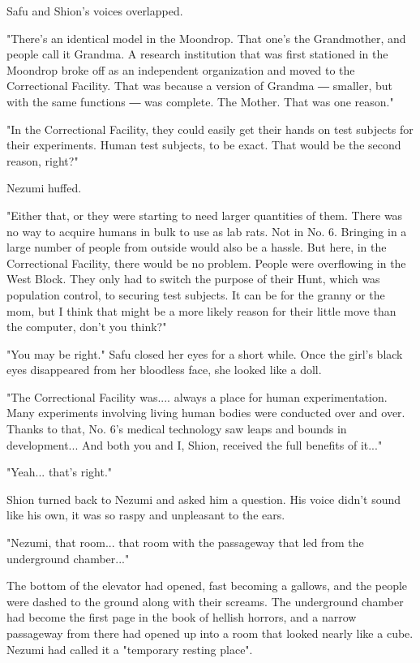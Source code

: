 Safu and Shion's voices overlapped.

"There's an identical model in the Moondrop. That one's the Grandmother,
and people call it Grandma. A research institution that was first
stationed in the Moondrop broke off as an independent organization and
moved to the Correctional Facility. That was because a version of
Grandma ― smaller, but with the same functions ― was complete. The
Mother. That was one reason."

"In the Correctional Facility, they could easily get their hands on test
subjects for their experiments. Human test subjects, to be exact. That
would be the second reason, right?"

Nezumi huffed.

"Either that, or they were starting to need larger quantities of them.
There was no way to acquire humans in bulk to use as lab rats. Not in
No. 6. Bringing in a large number of people from outside would also be a
hassle. But here, in the Correctional Facility, there would be no
problem. People were overflowing in the West Block. They only had to
switch the purpose of their Hunt, which was population control, to
securing test subjects. It can be for the granny or the mom, but I think
that might be a more likely reason for their little move than the
computer, don't you think?"

"You may be right." Safu closed her eyes for a short while. Once the
girl's black eyes disappeared from her bloodless face, she looked like a
doll.

"The Correctional Facility was.... always a place for human
experimentation. Many experiments involving living human bodies were
conducted over and over. Thanks to that, No. 6's medical technology saw
leaps and bounds in development... And both you and I, Shion, received
the full benefits of it..."

"Yeah... that's right."

Shion turned back to Nezumi and asked him a question. His voice didn't
sound like his own, it was so raspy and unpleasant to the ears.

"Nezumi, that room... that room with the passageway that led from the
underground chamber..."

The bottom of the elevator had opened, fast becoming a gallows, and the
people were dashed to the ground along with their screams. The
underground chamber had become the first page in the book of hellish
horrors, and a narrow passageway from there had opened up into a room
that looked nearly like a cube. Nezumi had called it a "temporary
resting place".

